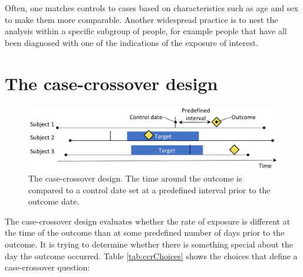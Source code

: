 \documentclass[11pt]{book}
\begin{document}
Often, one matches controls to cases based on characteristics such as
age and sex to make them more comparable. Another widespread practice is
to nest the analysis within a specific subgroup of people, for example
people that have all been diagnosed with one of the indications of the
exposure of interest.

\section{The case-crossover design}\label{the-case-crossover-design}

\begin{figure}

{\centering \includegraphics[width=0.9\linewidth]{images/PopulationLevelEstimation/caseCrossover} 

}

\caption{The case-crossover design. The time around the outcome is compared to a control date set at a predefined interval prior to the outcome date.}\label{fig:caseCrossover}
\end{figure}

The case-crossover \citep{maclure_1991} design evaluates whether the
rate of exposure is different at the time of the outcome than at some
predefined number of days prior to the outcome. It is trying to
determine whether there is something special about the day the outcome
occurred. Table \ref{tab:ccrChoices} shows the choices that define a
case-crossover question:
\end{document}
